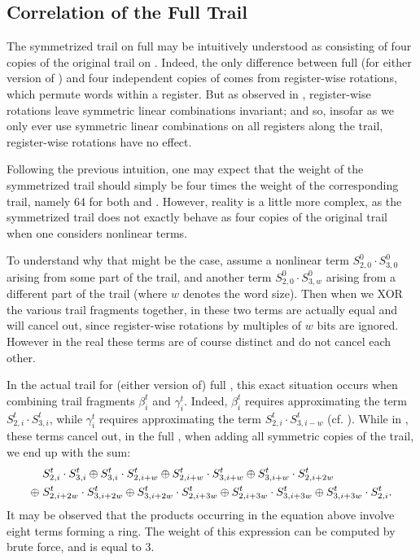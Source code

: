 \subsection{Correlation of the Full Trail}

The symmetrized trail on full \MORUS may be intuitively understood as consisting of four copies of the original trail on \MiniMORUS. Indeed, the only difference between full \MORUS (for either version of \MORUS) and four independent copies of \MiniMORUS comes from register-wise rotations, which permute words within a register. But as observed in , register-wise rotations leave symmetric linear combinations invariant; and so, insofar as we only ever use symmetric linear combinations on all registers along the trail, register-wise rotations have no effect.

Following the previous intuition, one may expect that the weight of the symmetrized trail should simply be four times the weight of the corresponding \MiniMORUS trail, namely 64 for both \MORUS[1280] and \MORUS[640]. However, reality is a little more complex, as the symmetrized trail does not exactly behave as four copies of the original trail when one considers nonlinear terms.

To understand why that might be the case, assume a nonlinear term $S^0_{2,0} \cdot S^0_{3,0}$ arising from some part of the trail, and another term $S^0_{2,0} \cdot S^0_{3,w}$ arising from a different part of the trail (where $w$ denotes the word size). Then when we XOR the various trail fragments together, in \MiniMORUS these two terms are actually equal and will cancel out, since register-wise rotations by multiples of $w$ bits are ignored. However in the real \MORUS these terms are of course distinct and do not cancel each other.

In the actual trail for (either version of) full \MORUS, this exact situation occurs when combining trail fragments $\beta^t_i$ and $\gamma^t_i$. Indeed, $\beta^t_i$ requires approximating the term $S^t_{2,i} \cdot S^t_{3,i}$, while $\gamma^t_i$ requires approximating the term $S^t_{2,i} \cdot S^t_{3,i-w}$ (cf. ). While in \MiniMORUS, these terms cancel out, in the full \MORUS, when adding all symmetric copies of the trail, we end up with the sum:
{
\allowdisplaybreaks[0]
\begin{align}
&S^t_{2,i} \cdot S^t_{3,i} \oplus S^t_{3,i} \cdot S^t_{2,i+w}
\oplus S^t_{2,i+w} \cdot S^t_{3,i+w} \oplus S^t_{3,i+w} \cdot S^t_{2,i+2w}\notag\\
\oplus\; &S^t_{2,i+2w} \cdot S^t_{3,i+2w} \oplus S^t_{3,i+2w} \cdot S^t_{2,i+3w}
\oplus S^t_{2,i+3w} \cdot S^t_{3,i+3w} \oplus S^t_{3,i+3w} \cdot S^t_{2,i}.\label{eq:8circle}
\end{align}
}
It may be observed that the products occurring in the equation above involve eight terms forming a ring. The weight of this expression can be computed by brute force, and is equal to $3$.

